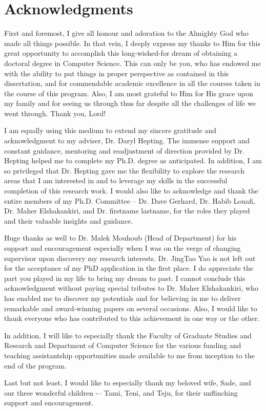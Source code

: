 \chapter*{Acknowledgments}
First and foremost, I give all honour and adoration to the Almighty God who made all things possible. In that vein, I deeply express my thanks to Him for this great opportunity to accomplish this long-wished-for dream of obtaining a doctoral degree in Computer Science. This can only be you, who has endowed me with the ability to put things in proper perspective as contained in this dissertation, and for commendable academic excellence in all the courses taken in the course of this program. Also, I am most grateful to Him for His grace upon my family and for seeing us through thus far despite all the challenges of life we went through. Thank you, Lord!

I am equally using this medium to extend my sincere gratitude and acknowledgment to my adviser, Dr. Daryl Hepting. The immense support and constant guidance, mentoring and readjustment of direction provided by Dr. Hepting helped me to complete my Ph.D. degree as anticipated. In addition, I am so privileged that Dr. Hepting gave me the flexibility to explore the research areas that I am interested in and to leverage my skills in the successful completion of this research work. I would also like to acknowledge and thank the entire members of my Ph.D. Committee -- Dr. Dave Gerhard, Dr. Habib Louafi, Dr. Maher Elshakankiri, and Dr. firstname lastname, for the roles they played and their valuable insights and guidance. 

Huge thanks as well to Dr. Malek Mouhoub (Head of Department) for his support and encouragement especially when I was on the verge of changing supervisor upon discovery my research interests. Dr. JingTao Yao is not left out for the acceptance of my PhD application in the first place. I do appreciate the part you played in my life to bring my dream to past. I cannot conclude this acknowledgment without paying special tributes to Dr. Maher Elshakankiri, who has enabled me to discover my potentials and for believing in me to deliver remarkable and award-winning papers on several occasions. Also, I would like to thank everyone who has contributed to this achievement in one way or the other. 

In addition, I will like to especially thank the Faculty of Graduate Studies and Research and Department of Computer Science for the various funding and teaching assistantship opportunities made available to me from inception to the end of the program.

Last but not least, I would like to especially thank my beloved wife, Sade, and our three wonderful children -– Tami, Teni, and Teju, for their unflinching support and encouragement.